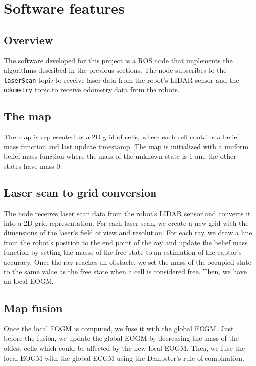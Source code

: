 \section{Software features}

\subsection{Overview}

The software developed for this project is a ROS node that implements the algorithms described in the previous sections.
The node subscribes to the \texttt{laserScan} topic to receive laser data from the robot's LIDAR sensor and the \texttt{odometry} topic to receive odometry data from the robots.

\subsection{The map}

The map is represented as a 2D grid of cells, where each cell contains a belief mass function and last update timestamp.
The map is initialized with a uniform belief mass function where the mass of the unknown state is $1$ and the other states have mass $0$.


\subsection{Laser scan to grid conversion}

The node receives laser scan data from the robot's LIDAR sensor and converts it into a 2D grid representation.
For each laser scan, we create a new grid with the dimensions of the laser's field of view and resolution.
For each ray, we draw a line from the robot's position to the end point of the ray and update the belief mass function by setting the masse of the free state to an estimation of the captor's accuracy.
Once the ray reaches an obstacle, we set the mass of the occupied state to the same value as the free state when a cell is considered free.
Then, we have an local EOGM.

\subsection*{Map fusion}

Once the local EOGM is computed, we fuse it with the global EOGM.
Just before the fusion, we update the global EOGM by decreasing the mass of the oldest cells which could be affected by the new local EOGM.
Then, we fuse the local EOGM with the global EOGM using the Dempster's rule of combination.
